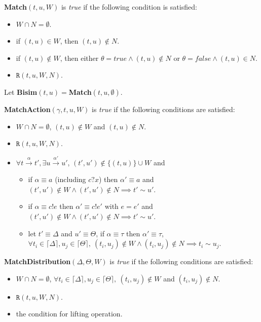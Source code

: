 \documentclass[runningheads]{llncs}
\begin{document}
\begin{definition}\label{def:match}
\textbf{Match}$(t,u,W)$ is \textit{true} if the following condition is satisfied:
\begin{itemize}
    \item $W\cap N=\emptyset$.
    \item if $(t,u)\in W$, then $(t,u)\notin N$.
    \item if $(t,u)\notin W$, then either $\theta=true\wedge(t,u)\notin N$ or $\theta=false\wedge(t,u)\in N$.
    \item $\texttt{R}(t,u,W,N)$.
\end{itemize}
Let \textbf{Bisim}$(t,u)=$\textbf{Match}$(t,u,\emptyset)$.
\end{definition}
\begin{definition}\label{def:matchaction}
\textbf{MatchAction}$(\gamma,t,u,W)$ is \textit{true} if the following conditions are satisfied:
\begin{itemize}
    \item $W\cap N=\emptyset$, $(t,u)\notin W$ and $(t,u)\notin N$.
    \item $\texttt{R}(t,u,W,N)$.
    \item $\forall t\xrightarrow{\alpha}t', \exists u\xrightarrow{\alpha'}u'$, $(t',u')\notin \{(t,u)\}\cup W$ and 
    \begin{itemize}
        \item if $\alpha\equiv a$ (including $c?x$) then $\alpha'\equiv a$ and $(t',u')\notin W\wedge(t',u')\notin N\implies t'\sim u'$.
        \item if $\alpha\equiv c!e$ then $\alpha'\equiv c!e'$ with $e=e'$ and $(t',u')\notin W\wedge(t',u')\notin N\implies t'\sim u'$.
        \item let $t'\equiv \Delta$ and $u'\equiv \Theta$, if $\alpha\equiv \tau$ then $\alpha'\equiv \tau$, $\forall t_i\in \lceil\Delta\rceil, u_j\in \lceil\Theta\rceil,\ (t_i,u_j)\notin W\wedge(t_i,u_j)\notin N\implies t_i\sim u_j$.
    \end{itemize}
\end{itemize}
\end{definition}
\begin{definition}\label{def:matchdistribution}
\textbf{MatchDistribution}$(\Delta,\Theta,W)$ is \textit{true} if the following conditions are satisfied:
\begin{itemize}
    \item $W\cap N=\emptyset$, $\forall t_i\in \lceil\Delta\rceil, u_j\in \lceil\Theta\rceil,\ (t_i,u_j)\notin W$ and $(t_i,u_j)\notin N$.
    \item $\texttt{R}(t,u,W,N)$.
    \item the condition for lifting operation.
\end{itemize}
\end{definition}
\end{document}
